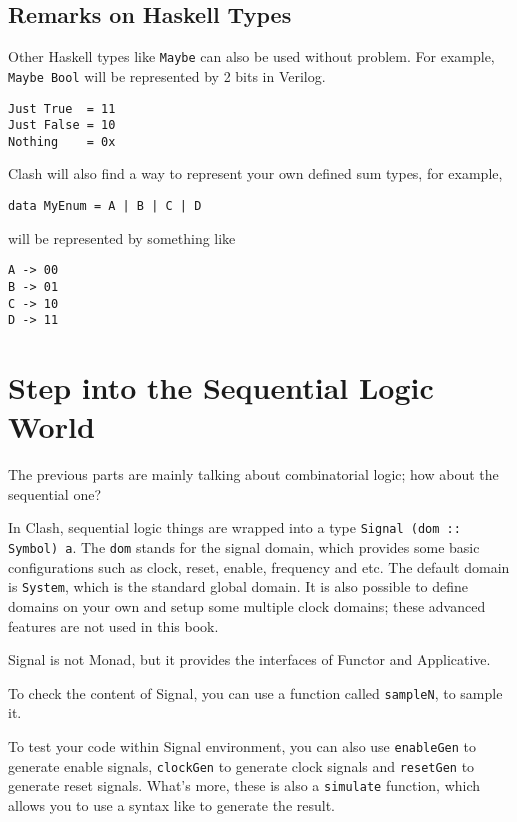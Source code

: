 \subsection{Remarks on Haskell Types}
Other Haskell types like \texttt{Maybe} can also be used without problem. For example, \texttt{Maybe Bool} will be represented by 2 bits in Verilog.
\begin{verbatim}
Just True  = 11
Just False = 10
Nothing    = 0x
\end{verbatim}
Clash will also find a way to represent your own defined sum types, for example,
\begin{verbatim}
data MyEnum = A | B | C | D
\end{verbatim}
will be represented by something like
\begin{verbatim}
A -> 00
B -> 01
C -> 10
D -> 11
\end{verbatim}

\section{Step into the Sequential Logic World} 
The previous parts are mainly talking about combinatorial logic; how about the sequential one? 

In Clash, sequential logic things are wrapped into a type \texttt{Signal (dom :: Symbol) a}.
The \texttt{dom} stands for the signal domain, which provides some basic configurations such as
clock, reset, enable, frequency and etc. The default domain is \texttt{System}, which is the standard global domain. It is also possible to define domains on your own and setup some multiple clock domains; these advanced features are not used in this book.

Signal is not Monad, but it provides the interfaces of Functor and Applicative.

To check the content of Signal, you can use a function called \texttt{sampleN}, to sample it.

To test your code within Signal environment, you can also use \texttt{enableGen} to generate enable signals, 
\texttt{clockGen} to generate clock signals and \texttt{resetGen} to generate reset signals. What's more, these is also a \texttt{simulate} function, which allows you to use a syntax like  to generate the result.

